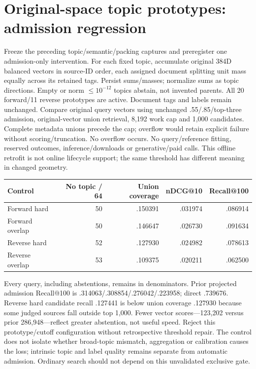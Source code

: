 \documentclass[11pt]{article}
\begin{document}
\section{Original-space topic prototypes: admission regression}
Freeze the preceding topic/semantic/packing captures and preregister one
admission-only intervention. For each fixed topic, accumulate original 384D
balanced vectors in source-ID order, each assigned document splitting unit
mass equally across its retained tags. Persist sums/masses; normalize sums as
topic directions. Empty or norm $\leq10^{-12}$ topics abstain, not invented
parents. All 20 forward/11 reverse prototypes are active. Document tags and
labels remain unchanged. Compare original query vectors using unchanged
.55/.85/top-three admission, original-vector union retrieval, 8,192 work cap
and 1,000 candidates. Complete metadata unions precede the cap; overflow
would retain explicit failure without scoring/truncation. No overflow occurs.
No query/reference fitting, reserved outcomes, inference/downloads or
generative/paid calls. This offline retrofit is not online lifecycle support;
the same threshold has different meaning in changed geometry.

\begin{center}\small
\begin{tabular}{lrrrr}
\toprule
Control & No topic / 64 & Union coverage & nDCG@10 & Recall@100\\
\midrule
Forward hard & 50 & .150391 & .031974 & .086914\\
Forward overlap & 50 & .146647 & .026730 & .091634\\
Reverse hard & 52 & .127930 & .024982 & .078613\\
Reverse overlap & 53 & .109375 & .020211 & .062500\\
\bottomrule
\end{tabular}\end{center}
Every query, including abstentions, remains in denominators. Prior projected
admission Recall@100 is .314063/.308854/.276042/.223958; direct .739676.
Reverse hard candidate recall .127441 is below union coverage .127930 because
some judged sources fall outside top 1,000. Fewer vector scores---123,202
versus prior 286,948---reflect greater abstention, not useful speed. Reject
this prototype/cutoff configuration without retrospective threshold repair.
The control does not isolate whether broad-topic mismatch, aggregation or
calibration causes the loss; intrinsic topic and label quality remains separate
from automatic admission. Ordinary search should not depend on this unvalidated
exclusive gate.
\end{document}
